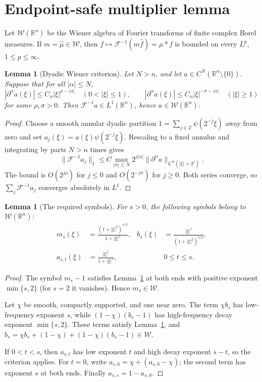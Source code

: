 \documentclass[11pt]{article}
\newtheorem{lemma}[theorem]{Lemma}
\newcommand{\R}{\mathbb R}
\newcommand{\F}{\mathcal F}
\newcommand{\norm}[1]{\lVert #1\rVert}
\begin{document}
\section*{Endpoint-safe multiplier lemma}

Let \(\mathcal W(\R^n)\) be the Wiener algebra of Fourier transforms of
finite complex Borel measures.  If \(m=\widehat\mu\in\mathcal W\), then
\(f\mapsto\F^{-1}(m\widehat f)=\mu*f\) is bounded on every \(L^p\),
\(1\leq p\leq\infty\).

\begin{lemma}[Dyadic Wiener criterion]\label{lem:wiener}
Let \(N>n\), and let \(a\in C^N(\R^n\setminus\{0\})\).  Suppose that for
all \(|\alpha|\leq N\),
\[
 |\partial^\alpha a(\xi)|\leq C_\alpha |\xi|^{\rho-|\alpha|}
 \quad(0<|\xi|\leq1),\qquad
 |\partial^\alpha a(\xi)|\leq C_\alpha |\xi|^{-\sigma-|\alpha|}
 \quad(|\xi|\geq1)
\]
for some \(\rho,\sigma>0\).  Then
\(\F^{-1}a\in L^1(\R^n)\), hence \(a\in\mathcal W(\R^n)\).
\end{lemma}

\begin{proof}
Choose a smooth annular dyadic partition
\(1=\sum_{j\in\mathbb Z}\psi(2^{-j}\xi)\) away from zero and set
\(a_j(\xi)=a(\xi)\psi(2^{-j}\xi)\).  Rescaling to a fixed annulus and
integrating by parts \(N>n\) times gives
\[
 \norm{\F^{-1}a_j}_1
 \leq C\max_{|\alpha|\leq N}
 2^{j|\alpha|}\norm{\partial^\alpha a}_{L^\infty(|\xi|\asymp2^j)}.
\]
The bound is \(O(2^{j\rho})\) for \(j\leq0\) and
\(O(2^{-j\sigma})\) for \(j\geq0\).  Both series converge, so
\(\sum_j\F^{-1}a_j\) converges absolutely in \(L^1\).
\end{proof}

\begin{lemma}[The required symbols]\label{lem:symbols}
For \(s>0\), the following symbols belong to \(\mathcal W(\R^n)\):
\begin{align*}
 m_s(\xi)&=\frac{(1+|\xi|^2)^{s/2}}{1+|\xi|^s},
 &b_s(\xi)&=\frac{|\xi|^s}{(1+|\xi|^2)^{s/2}},\\
 a_{s,t}(\xi)&=\frac{|\xi|^t}{1+|\xi|^s},
 &&0\leq t\leq s.
\end{align*}
\end{lemma}

\begin{proof}
The symbol \(m_s-1\) satisfies Lemma~\ref{lem:wiener} at both ends with
positive exponent \(\min\{s,2\}\) (for \(s=2\) it vanishes).  Hence
\(m_s\in\mathcal W\).

Let \(\chi\) be smooth, compactly supported, and one near zero.
The term \(\chi b_s\) has low-frequency exponent \(s\), while
\((1-\chi)(b_s-1)\) has high-frequency decay exponent
\(\min\{s,2\}\).  These terms satisfy Lemma~\ref{lem:wiener}, and
\(b_s=\chi b_s+(1-\chi)+(1-\chi)(b_s-1)\in\mathcal W\).

If \(0<t<s\), then \(a_{s,t}\) has low exponent \(t\) and high decay
exponent \(s-t\), so the criterion applies.  For \(t=0\), write
\(a_{s,0}=\chi+(a_{s,0}-\chi)\); the second term has exponent \(s\) at
both ends.  Finally \(a_{s,s}=1-a_{s,0}\).
\end{proof}
\end{document}
